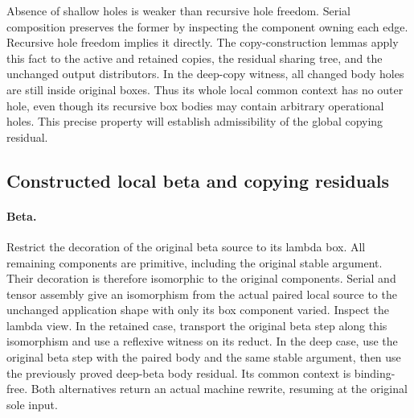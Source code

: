 


Absence of shallow holes is weaker than recursive hole freedom. Serial
composition preserves the former by inspecting the component owning each
edge. Recursive hole freedom implies it directly. The copy-construction
lemmas apply this fact to the active and retained copies, the residual
sharing tree, and the unchanged output distributors. In the deep-copy
witness, all changed body holes are still inside original boxes. Thus its
whole local common context has no outer hole, even though its recursive
box bodies may contain arbitrary operational holes. This precise property
will establish admissibility of the global copying residual.





\par{}

\subsection{Constructed local beta and copying residuals}
\paragraph{Beta.}
Restrict the decoration of the original beta source to its lambda box.
All remaining components are primitive, including the original stable
argument. Their decoration is therefore isomorphic to the original
components. Serial and tensor assembly give an isomorphism from the actual
paired local source to the unchanged application shape with only its box
component varied. Inspect the lambda view. In the retained case, transport
the original beta step along this isomorphism and use a reflexive witness
on its reduct. In the deep case, use the original beta step with the paired
body and the same stable argument, then use the previously proved deep-beta
body residual. Its common context is binding-free. Both alternatives return
an actual machine rewrite, resuming at the original sole input.

